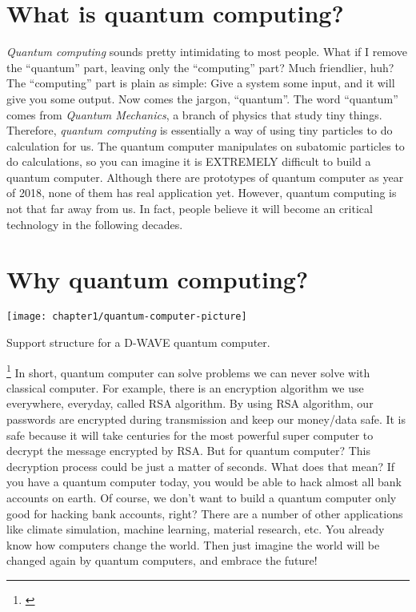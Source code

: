 \section{\textbf{What} is quantum computing?}

\begin{fullwidth}

    \textit{Quantum computing} sounds pretty intimidating to most people. What if I remove the ``quantum'' part, leaving only the ``computing'' part? 
    Much friendlier, huh? 
    The ``computing'' part is plain as simple: Give a system some input, and it will give you some output. 
    Now comes the jargon, ``quantum''. The word ``quantum'' comes from \textit{Quantum Mechanics}, a branch of physics that study tiny things. 
    Therefore, \textit{quantum computing} is essentially a way of using tiny particles to do calculation for us.
    The quantum computer manipulates on subatomic particles to do calculations, so you can imagine it is EXTREMELY difficult to build a quantum computer.
    Although there are prototypes of quantum computer as year of 2018, none of them has real application yet.
    However, quantum computing is not that far away from us.
    In fact, people believe it will become an critical technology in the following decades.

\end{fullwidth}

\section{\textbf{Why} quantum computing?}

\begin{marginfigure}[15\baselineskip]
    \texttt{[image: chapter1/quantum-computer-picture]}
    \caption{Support structure for a D-WAVE quantum computer.}
    \label{fig:chapter1-quantum-computer-picture}
\end{marginfigure}

\footnote{\cite{Chapter1-quantum-computer-picture}}
In short, quantum computer can solve problems we can never solve with classical computer.
For example, there is an encryption algorithm we use everywhere, everyday, called RSA algorithm.
By using RSA algorithm, our passwords are encrypted during transmission and keep our money/data safe.
It is safe because it will take centuries for the most powerful super computer to decrypt the message encrypted by RSA.
But for quantum computer? This decryption process could be just a matter of seconds. 
What does that mean? If you have a quantum computer today, you would be able to hack almost all bank accounts on earth.
Of course, we don't want to build a quantum computer only good for hacking bank accounts, right?
There are a number of other applications like climate simulation, machine learning, material research, etc.
You already know how computers change the world.
Then just imagine the world will be changed again by quantum computers, and embrace the future!

